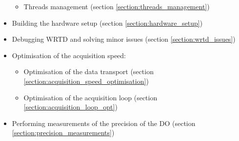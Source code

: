 \begin{itemize}
\begin{itemize}
\begin{itemize}
                \end{itemize}
            \item Threads management (section \ref{section:threads_management})
        \end{itemize}
    \item Building the hardware setup (section \ref{section:hardware_setup})
    \item Debugging WRTD and solving minor issues (section \ref{section:wrtd_issues})
    \item Optimisation of the acquisition speed:
        \begin{itemize}
            \item Optimisation of the data transport (section \ref{section:acquisition_speed_optimisation})
            \item Optimisation of the acquisition loop (section \ref{section:acquisition_loop_opt})
        \end{itemize}
    \item Performing measurements of the precision of the DO (section \ref{section:precision_measurements})
\end{itemize}


